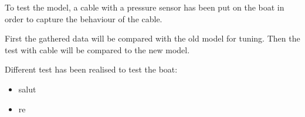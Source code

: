 To test the model, a cable with a pressure sensor has been put on the boat in order to capture the behaviour
of the cable.

First the gathered data will be compared with the old model for tuning. Then the test with cable will be compared to the new model.

Different test has been realised to test the boat:

\begin{itemize}
\item salut
\item re
\end{itemize}